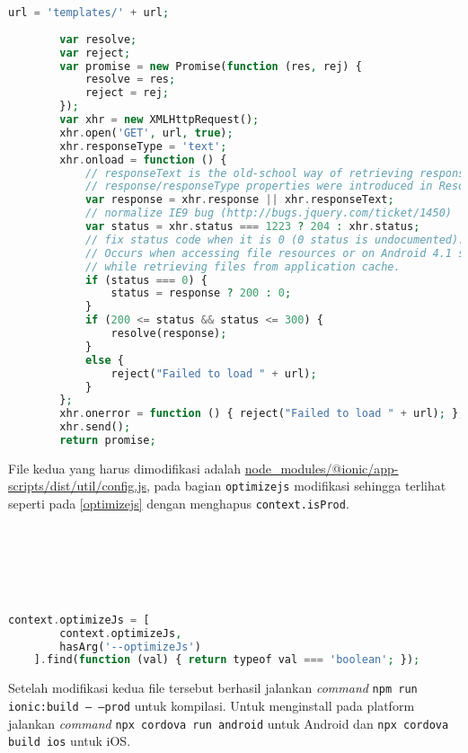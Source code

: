 \begin{lstlisting}[frame=single, label={lst:noresourceloaderreplace}, language=PHP, caption=Kode pengganti untuk fungsi \texttt{get}]
url = 'templates/' + url;
 
        var resolve;
        var reject;
        var promise = new Promise(function (res, rej) {
            resolve = res;
            reject = rej;
        });
        var xhr = new XMLHttpRequest();
        xhr.open('GET', url, true);
        xhr.responseType = 'text';
        xhr.onload = function () {
            // responseText is the old-school way of retrieving response (supported by IE8 & 9)
            // response/responseType properties were introduced in ResourceLoader Level2 spec (supported by IE10)
            var response = xhr.response || xhr.responseText;
            // normalize IE9 bug (http://bugs.jquery.com/ticket/1450)
            var status = xhr.status === 1223 ? 204 : xhr.status;
            // fix status code when it is 0 (0 status is undocumented).
            // Occurs when accessing file resources or on Android 4.1 stock browser
            // while retrieving files from application cache.
            if (status === 0) {
                status = response ? 200 : 0;
            }
            if (200 <= status && status <= 300) {
                resolve(response);
            }
            else {
                reject("Failed to load " + url);
            }
        };
        xhr.onerror = function () { reject("Failed to load " + url); };
        xhr.send();
        return promise;
\end{lstlisting}

File kedua yang harus dimodifikasi adalah \url{node_modules/@ionic/app-scripts/dist/util/config.js}, pada bagian \texttt{optimizejs} modifikasi sehingga terlihat seperti pada \mbox{\ref{optimizejs}} dengan menghapus \texttt{context.isProd}.
\\
\\
\\
\\
\\
\\
\begin{lstlisting}[frame=single, label={optimizejs}, language=PHP, caption= \texttt{optimizejs} setelah modifikasi]
context.optimizeJs = [
        context.optimizeJs,
        hasArg('--optimizeJs')
    ].find(function (val) { return typeof val === 'boolean'; });
\end{lstlisting}
Setelah modifikasi kedua file tersebut berhasil jalankan \textit{command} \texttt{npm run ionic:build -- --prod} untuk kompilasi. Untuk menginstall pada platform jalankan \textit{command} \texttt{npx cordova run android} untuk Android dan \texttt{npx cordova build ios} untuk iOS.

